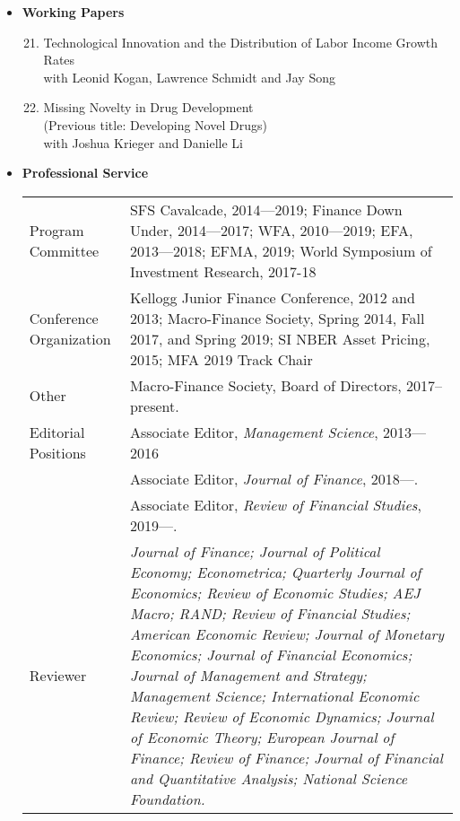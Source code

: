 \documentclass[11pt,letterpaper,serif,overlapped]{res}
\begin{document}
\begin{resume}
\begin{itemize}
\begin{enumerate}
\end{enumerate}
\vspace{0.5cm}
\item \textbf{Working Papers}
\begin{enumerate}
\setcounter{enumi}{20}
\item Technological Innovation and the Distribution of Labor Income Growth Rates\\ with Leonid Kogan, Lawrence Schmidt and Jay Song
\item Missing Novelty in Drug Development\\(Previous title:  Developing Novel Drugs)\\with Joshua Krieger and Danielle Li
\end{enumerate}







\vspace{0.5cm}
\item \textbf{Professional Service} \\
\begin{longtable}{lp{11.5cm}}
Program Committee & SFS Cavalcade, 2014---2019; Finance Down Under,   2014---2017;  WFA,  2010---2019; EFA, 2013---2018; EFMA, 2019;  World Symposium of Investment Research, 2017-18 \\[0.2cm]
Conference Organization & Kellogg Junior Finance Conference,  2012 and 2013;  Macro-Finance Society, Spring 2014, Fall 2017, and Spring 2019; SI NBER Asset Pricing, 2015; MFA 2019 Track Chair\\[0.2cm]
Other & Macro-Finance Society, Board of Directors, 2017--present.
\\[0.2cm]

Editorial Positions & Associate Editor, \emph{Management Science}, 2013---2016\\
  &Associate Editor, \emph{Journal of Finance}, 2018---.\\
  &Associate Editor, \emph{Review of Financial Studies}, 2019---.\\[0.2cm]

Reviewer&
\emph{Journal of Finance; Journal of Political Economy; Econometrica; Quarterly Journal of Economics; Review of Economic Studies; AEJ Macro; RAND;  Review of Financial Studies; American Economic Review;  Journal of Monetary Economics; Journal of Financial Economics; Journal of Management and Strategy; Management Science;  International Economic Review; Review of Economic Dynamics;   Journal of Economic Theory;   European Journal of Finance;   Review of Finance; Journal of Financial and Quantitative Analysis; National Science Foundation.}\\[0.2cm]


\end{longtable}
\end{itemize}
\end{resume}
\end{document}
